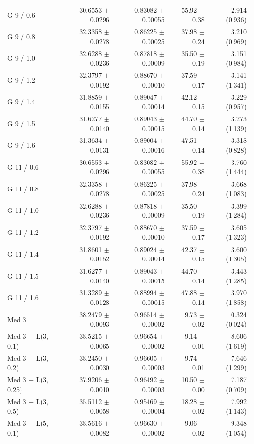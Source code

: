 \begin{longtable}{lrrrr}
G 9 / 0.6 & 30.6553 $\pm$ 0.0296 & 0.83082 $\pm$ 0.00055 & 55.92 $\pm$ 0.38 & 2.914 (0.936) \\
G 9 / 0.8 & 32.3358 $\pm$ 0.0278 & 0.86225 $\pm$ 0.00025 & 37.98 $\pm$ 0.24 & 3.210 (0.969) \\
G 9 / 1.0 & 32.6288 $\pm$ 0.0236 & 0.87818 $\pm$ 0.00009 & 35.50 $\pm$ 0.19 & 3.151 (0.984) \\
G 9 / 1.2 & 32.3797 $\pm$ 0.0192 & 0.88670 $\pm$ 0.00010 & 37.59 $\pm$ 0.17 & 3.141 (1.341) \\
G 9 / 1.4 & 31.8859 $\pm$ 0.0155 & 0.89047 $\pm$ 0.00014 & 42.12 $\pm$ 0.15 & 3.229 (0.957) \\
G 9 / 1.5 & 31.6277 $\pm$ 0.0140 & 0.89043 $\pm$ 0.00015 & 44.70 $\pm$ 0.14 & 3.273 (1.139) \\
G 9 / 1.6 & 31.3634 $\pm$ 0.0131 & 0.89004 $\pm$ 0.00016 & 47.51 $\pm$ 0.14 & 3.318 (0.828) \\
G 11 / 0.6 & 30.6553 $\pm$ 0.0296 & 0.83082 $\pm$ 0.00055 & 55.92 $\pm$ 0.38 & 3.760 (1.444) \\
G 11 / 0.8 & 32.3358 $\pm$ 0.0278 & 0.86225 $\pm$ 0.00025 & 37.98 $\pm$ 0.24 & 3.668 (1.083) \\
G 11 / 1.0 & 32.6288 $\pm$ 0.0236 & 0.87818 $\pm$ 0.00009 & 35.50 $\pm$ 0.19 & 3.399 (1.284) \\
G 11 / 1.2 & 32.3797 $\pm$ 0.0192 & 0.88670 $\pm$ 0.00010 & 37.59 $\pm$ 0.17 & 3.605 (1.323) \\
G 11 / 1.4 & 31.8601 $\pm$ 0.0152 & 0.89024 $\pm$ 0.00014 & 42.37 $\pm$ 0.15 & 3.600 (1.305) \\
G 11 / 1.5 & 31.6277 $\pm$ 0.0140 & 0.89043 $\pm$ 0.00015 & 44.70 $\pm$ 0.14 & 3.443 (1.285) \\
G 11 / 1.6 & 31.3289 $\pm$ 0.0128 & 0.88994 $\pm$ 0.00015 & 47.88 $\pm$ 0.14 & 3.970 (1.858) \\
Med 3 & 38.2479 $\pm$ 0.0093 & 0.96514 $\pm$ 0.00002 & 9.73 $\pm$ 0.02 & 0.324 (0.024) \\
Med 3 + L(3, 0.1) & 38.5215 $\pm$ 0.0065 & 0.96654 $\pm$ 0.00002 & 9.14 $\pm$ 0.01 & 8.606 (1.619) \\
Med 3 + L(3, 0.2) & 38.2450 $\pm$ 0.0030 & 0.96605 $\pm$ 0.00003 & 9.74 $\pm$ 0.01 & 7.646 (1.299) \\
Med 3 + L(3, 0.25) & 37.9206 $\pm$ 0.0010 & 0.96492 $\pm$ 0.00003 & 10.50 $\pm$ 0.00 & 7.187 (0.709) \\
Med 3 + L(3, 0.5) & 35.5112 $\pm$ 0.0058 & 0.95469 $\pm$ 0.00004 & 18.28 $\pm$ 0.02 & 7.992 (1.143) \\
Med 3 + L(5, 0.1) & 38.5616 $\pm$ 0.0082 & 0.96630 $\pm$ 0.00002 & 9.06 $\pm$ 0.02 & 9.348 (1.054) \\

\end{longtable}
